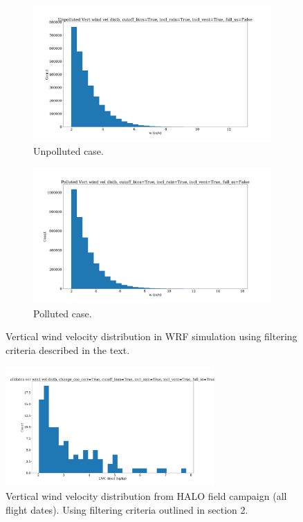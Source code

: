 \documentclass{article}
\begin{document}
\begin{figure}[ht]
	\centering
	\begin{subfigure}{0.7\textwidth}
		\includegraphics[width=\textwidth]{revmywrf/v9_w_hist_Unpolluted_figure.png}
		\caption{Unpolluted case.}
		\label{wrfwhistunpoll}
	\end{subfigure}
	\begin{subfigure}{0.7\textwidth}
		\includegraphics[width=\textwidth]{revmywrf/v9_w_hist_Polluted_figure.png}
		\caption{Polluted case.}
		\label{wrfwhistpoll}
	\end{subfigure}
	\caption{Vertical wind velocity distribution in WRF simulation using filtering criteria described in the text.}
	\label{wrfwhist}
\end{figure}
\begin{figure}[ht]
    \centering
    \includegraphics[width=8cm]{revhalo/v24_w_hist_cas_alldates_figure.png}
    \caption{Vertical wind velocity distribution from HALO field campaign (all flight dates). Using filtering criteria outlined in section 2.}
    \label{halowhist}
\end{figure}
\end{document}
